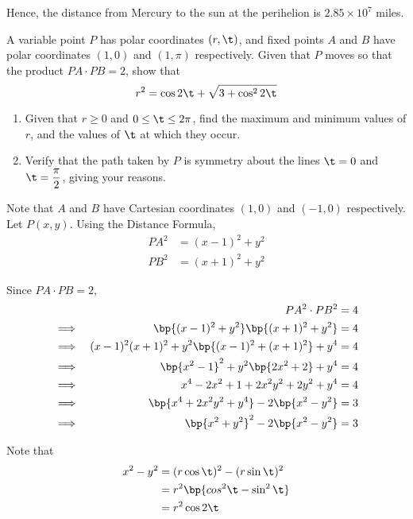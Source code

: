 \documentclass{echw}
\begin{document}
        Hence, the distance from Mercury to the sun at the perihelion is $2.85 \times 10^7$ miles.


    \problem{}
        A variable point $P$ has polar coordinates $(r, \t)$, and fixed points $A$ and $B$ have polar coordinates $(1, 0)$ and $(1, \pi)$ respectively. Given that $P$ moves so that the product $PA\cdot PB = 2$, show that
        \[
            r^2 = \cos2\t + \sqrt{3 + \cos^22\t}
        \]

        \begin{enumerate}
            \item Given that $r \geq 0$ and $0 \leq \t \leq 2\pi$, find the maximum and minimum values of $r$, and the values of $\t$ at which they occur.
            \item Verify that the path taken by $P$ is symmetry about the lines $\t = 0$ and $\t = \dfrac{\pi}{2}$, giving your reasons.
        \end{enumerate}

    \solution
        Note that $A$ and $B$ have Cartesian coordinates $(1, 0)$ and $(-1, 0)$ respectively. Let $P(x, y)$. Using the Distance Formula,
        \begin{align*}
            PA^2 &= (x-1)^2 + y^2\\
            PB^2 &= (x+1)^2 + y^2
        \end{align*}

        Since $PA \cdot PB = 2$,
        \begin{alignat*}{2}
            &&PA^2 \cdot PB^2 &= 4\\
            \implies&&\bp{(x-1)^2 + y^2}\bp{(x+1)^2 + y^2} &= 4\\
            \implies&&(x-1)^2(x+1)^2 + y^2\bp{(x-1)^2 + (x+1)^2} + y^4 &= 4\\
            \implies&&\bp{x^2 - 1}^2 + y^2\bp{2x^2 + 2} + y^4 &= 4\\
            \implies&&x^4 - 2x^2 + 1 + 2x^2y^2 + 2y^2 + y^4 &= 4\\
            \implies&&\bp{x^4 + 2x^2y^2 + y^4} - 2\bp{x^2 - y^2} &= 3\\
            \implies&&\bp{x^2 + y^2}^2 - 2\bp{x^2 - y^2} &= 3
        \end{alignat*}

        Note that
        \begin{align*}
            x^2 - y^2 &= (r\cos\t)^2 - (r\sin\t)^2\\
            &= r^2 \bp{cos^2\t - \sin^2\t}\\
            &= r^2 \cos2\t
        \end{align*}
\end{document}
